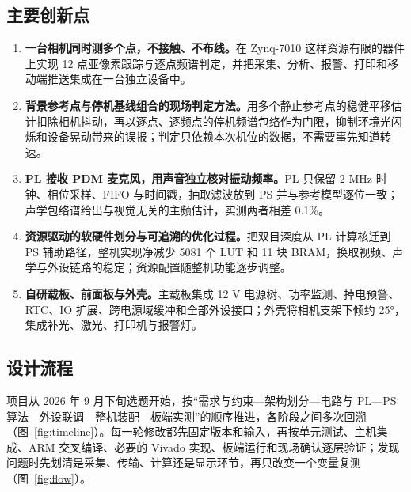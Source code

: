 \subsection{主要创新点}

\begin{enumerate}[leftmargin=2em]
\item \textbf{一台相机同时测多个点，不接触、不布线。}在 Zynq-7010 这样资源有限的器件上实现 12 点亚像素跟踪与逐点频谱判定，并把采集、分析、报警、打印和移动端推送集成在一台独立设备中。
\item \textbf{背景参考点与停机基线组合的现场判定方法。}用多个静止参考点的稳健平移估计扣除相机抖动，再以逐点、逐频点的停机频谱包络作为门限，抑制环境光闪烁和设备晃动带来的误报；判定只依赖本次机位的数据，不需要事先知道转速。
\item \textbf{PL 接收 PDM 麦克风，用声音独立核对振动频率。}PL 只保留 2 MHz 时钟、相位采样、FIFO 与时间戳，抽取滤波放到 PS 并与参考模型逐位一致；声学包络谱给出与视觉无关的主频估计，实测两者相差 0.1\%。
\item \textbf{资源驱动的软硬件划分与可追溯的优化过程。}把双目深度从 PL 计算核迁到 PS 辅助路径，整机实现净减少 5081 个 LUT 和 11 块 BRAM，换取视频、声学与外设链路的稳定；资源配置随整机功能逐步调整。
\item \textbf{自研载板、前面板与外壳。}主载板集成 12 V 电源树、功率监测、掉电预警、RTC、IO 扩展、跨电源域缓冲和全部外设接口；外壳将相机支架下倾约 25°，集成补光、激光、打印机与报警灯。
\end{enumerate}

\subsection{设计流程}

项目从 2026 年 9 月下旬选题开始，按“需求与约束—架构划分—电路与 PL—PS 算法—外设联调—整机装配—板端实测”的顺序推进，各阶段之间多次回溯（图~\ref{fig:timeline}）。每一轮修改都先固定版本和输入，再按单元测试、主机集成、ARM 交叉编译、必要的 Vivado 实现、板端运行和现场确认逐层验证；发现问题时先划清是采集、传输、计算还是显示环节，再只改变一个变量复测（图~\ref{fig:flow}）。

